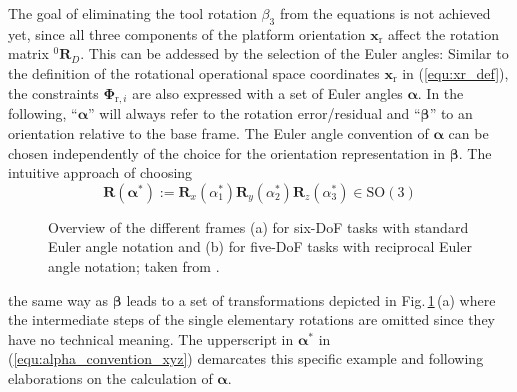 \documentclass[robotics,article,submit,moreauthors,pdftex]{Definitions/mdpi}
\newcommand{\bm}[1]{\boldsymbol{#1}}
\newcommand{\rotmat}[2]{{{ }^{#1}\boldsymbol{R}}_{#2}}
\begin{document}
The goal of eliminating the tool rotation $\beta_3$ from the equations is not achieved yet, since all three components of the platform orientation $\bm{x}_\mathrm{r}$ affect the rotation matrix $\rotmat{0}{D}$. This can be addessed by the selection of the Euler angles:
Similar to the definition of the rotational operational space coordinates $\bm{x}_\mathrm{r}$ in (\ref{equ:xr_def}), the constraints $\bm{\Phi}_{\mathrm{r},i}$ are also expressed with a set of Euler angles $\bm{\alpha}$.
In the following, ``$\bm{\alpha}$'' will always refer to the rotation error/residual and ``$\bm{\beta}$'' to an orientation relative to the base frame.
The Euler angle convention of $\bm{\alpha}$ can be chosen independently of the choice for the orientation representation in  $\bm{\beta}$.
The intuitive approach of choosing
%
\begin{equation}
\bm{R}(\bm{\alpha}^*) := \bm{R}_x(\alpha_1^*) \bm{R}_y(\alpha_2^*) \bm{R}_z(\alpha_3^*) \in \mathrm{SO(3)}
\label{equ:alpha_convention_xyz}
\end{equation}
%
\begin{figure}[tb]
    
    \caption{Overview of the different frames (a) for six-DoF tasks with standard Euler angle notation and (b) for five-DoF tasks with reciprocal Euler angle notation; taken from \cite{1_SchapplerTapOrt2019}.}
    \label{fig:frames_5dof_6dof}
\end{figure} 
%
%
the same way as $\bm{\beta}$ leads to a set of transformations depicted in Fig.\,\ref{fig:frames_5dof_6dof}\,(a) where the intermediate steps of the single elementary rotations are omitted since they have no technical meaning.
The upperscript in $\bm{\alpha}^*$ in (\ref{equ:alpha_convention_xyz}) demarcates this specific example and following elaborations on the calculation of $\bm{\alpha}$.
\end{document}
